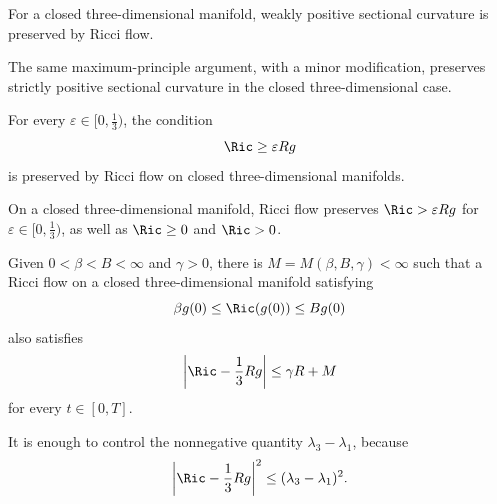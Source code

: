 \begin{theorem}
\label{topping-ch9-positive-sectional-preserved}
For a closed three-dimensional manifold, weakly positive sectional curvature
is preserved by Ricci flow.
\end{theorem}

\begin{remark}
\label{topping-ch9-positive-sectional-strong}
The same maximum-principle argument, with a minor modification, preserves
strictly positive sectional curvature in the closed three-dimensional case.
\end{remark}

\begin{theorem}
\label{topping-ch9-ricci-pinching-preserved}
For every \(\varepsilon\in[0,\tfrac13)\), the condition
\[
\Ric\ge\varepsilon Rg
\]
is preserved by Ricci flow on closed three-dimensional manifolds.
\end{theorem}

\begin{corollary}
\label{topping-ch9-ricci-positive-preserved}
On a closed three-dimensional manifold, Ricci flow preserves
\(\Ric>\varepsilon Rg\) for \(\varepsilon\in[0,\tfrac13)\), as well as
\(\Ric\ge0\) and \(\Ric>0\).
\end{corollary}

\begin{theorem}
\label{topping-ch9-roundness-estimate}
Given \(0<\beta<B<\infty\) and \(\gamma>0\), there is
\(M=M(\beta,B,\gamma)<\infty\) such that a Ricci flow on a closed
three-dimensional manifold satisfying
\[
\beta g(0)\le\Ric(g(0))\le Bg(0)
\]
also satisfies
\[
\left|\Ric-\frac13 Rg\right|\le\gamma R+M
\]
for every \(t\in[0,T]\).
\end{theorem}

\begin{remark}
\label{topping-ch9-roundness-reduction}
It is enough to control the nonnegative quantity \(\lambda_3-\lambda_1\),
because
\[
\left|\Ric-\frac13Rg\right|^2\le(\lambda_3-\lambda_1)^2.
\]
\end{remark}
